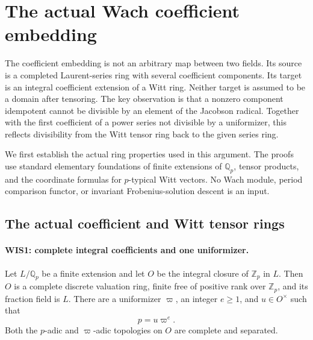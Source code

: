 \section{The actual Wach coefficient embedding}
\label{sec:wach-inclusion-saturation-v054}


The coefficient embedding is not an arbitrary map between two fields.
Its source is a completed Laurent-series ring with several coefficient
components. Its target is an integral coefficient extension of a Witt
ring. Neither target is assumed to be a domain after tensoring.
The key observation is that a nonzero component idempotent cannot be
divisible by an element of the Jacobson radical. Together with the
first coefficient of a power series not divisible by a uniformizer,
this reflects divisibility from the Witt tensor ring back to the
given series ring.

We first establish the actual ring properties used in this argument.
The proofs use standard elementary foundations of finite extensions
of $\mathbb Q_p$, tensor products, and the coordinate formulas for
$p$-typical Witt vectors. No Wach module, period comparison functor,
or invariant Frobenius-solution descent is an input.

\subsection{The actual coefficient and Witt tensor rings}

\paragraph{WIS1: complete integral coefficients and one uniformizer.}
\label{claim:WIS1}
Let $L/\mathbb Q_p$ be a finite extension and let $O$ be the integral
closure of $\mathbb Z_p$ in $L$. Then $O$ is a complete discrete
valuation ring, finite free of positive rank over $\mathbb Z_p$,
and its fraction field is $L$. There are a uniformizer $\varpi$,
an integer $e\geq1$, and $u\in O^\times$ such that
\[
                         p=u\varpi^e.                     \tag{WIS.1}
\]
Both the $p$-adic and $\varpi$-adic topologies on $O$ are complete
and separated.

